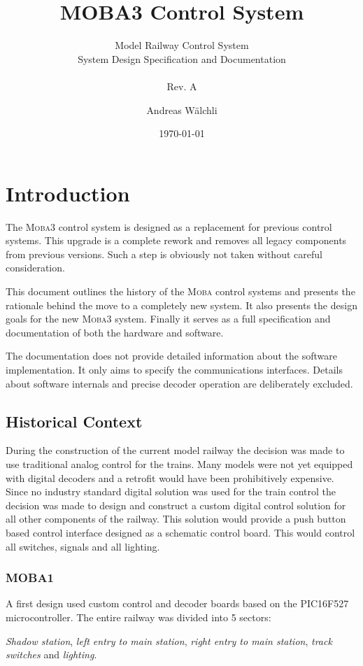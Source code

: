 \documentclass{scrreprt}
\title{MOBA3 Control System}
\subtitle{
Model Railway Control System\\
System Design Specification and Documentation\\\ \\
Rev. A}
\author{Andreas Wälchli}
\date{\today}
\begin{document}
\maketitle

\tableofcontents

\chapter{Introduction}
The \textsc{Moba3} control system is designed as a replacement for previous control systems.
This upgrade is a complete rework and removes all legacy components from previous versions.
Such a step is obviously not taken without careful consideration.

This document outlines the history of the \textsc{Moba} control systems and presents the rationale behind the move to a completely new system.
It also presents the design goals for the new \textsc{Moba3} system.
Finally it serves as a full specification and documentation of both the hardware and software.

The documentation does not provide detailed information about the software implementation.
It only aims to specify the communications interfaces.
Details about software internals and precise decoder operation are deliberately excluded.

\section{Historical Context}
During the construction of the current model railway the decision was made to use traditional analog control for the trains.
Many models were not yet equipped with digital decoders and a retrofit would have been prohibitively expensive.
Since no industry standard digital solution was used for the train control the decision was made to design and construct a custom digital control solution for all other components of the railway.
This solution would provide a push button based control interface designed as a schematic control board.
This would control all switches, signals and all lighting.

\subsection{MOBA1}
A first design used custom control and decoder boards based on the PIC16F527 microcontroller.
The entire railway was divided into 5 sectors:

\emph{Shadow station}, \emph{left entry to main station}, \emph{right entry to main station}, \emph{track switches} and \emph{lighting}.
\end{document}
